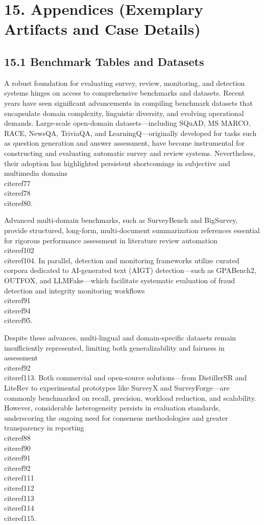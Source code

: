 \documentclass[11pt]{article}
\begin{document}
\section{15. Appendices (Exemplary Artifacts and Case Details)}

\subsection{15.1 Benchmark Tables and Datasets}

A robust foundation for evaluating survey, review, monitoring, and detection systems hinges on access to comprehensive benchmarks and datasets. Recent years have seen significant advancements in compiling benchmark datasets that encapsulate domain complexity, linguistic diversity, and evolving operational demands. Large-scale open-domain datasets—including SQuAD, MS MARCO, RACE, NewsQA, TriviaQA, and LearningQ—originally developed for tasks such as question generation and answer assessment, have become instrumental for constructing and evaluating automatic survey and review systems. Nevertheless, their adoption has highlighted persistent shortcomings in subjective and multimedia domains~\\cite{ref77}\\cite{ref78}\\cite{ref80}.

Advanced multi-domain benchmarks, such as SurveyBench and BigSurvey, provide structured, long-form, multi-document summarization references essential for rigorous performance assessment in literature review automation~\\cite{ref102}\\cite{ref104}. In parallel, detection and monitoring frameworks utilize curated corpora dedicated to AI-generated text (AIGT) detection—such as GPABench2, OUTFOX, and LLMFake—which facilitate systematic evaluation of fraud detection and integrity monitoring workflows~\\cite{ref91}\\cite{ref94}\\cite{ref95}.

Despite these advances, multi-lingual and domain-specific datasets remain insufficiently represented, limiting both generalizability and fairness in assessment~\\cite{ref92}\\cite{ref113}. Both commercial and open-source solutions—from DistillerSR and LiteRev to experimental prototypes like SurveyX and SurveyForge—are commonly benchmarked on recall, precision, workload reduction, and scalability. However, considerable heterogeneity persists in evaluation standards, underscoring the ongoing need for consensus methodologies and greater transparency in reporting~\\cite{ref88}\\cite{ref90}\\cite{ref91}\\cite{ref92}\\cite{ref111}\\cite{ref112}\\cite{ref113}\\cite{ref114}\\cite{ref115}.
\end{document}
